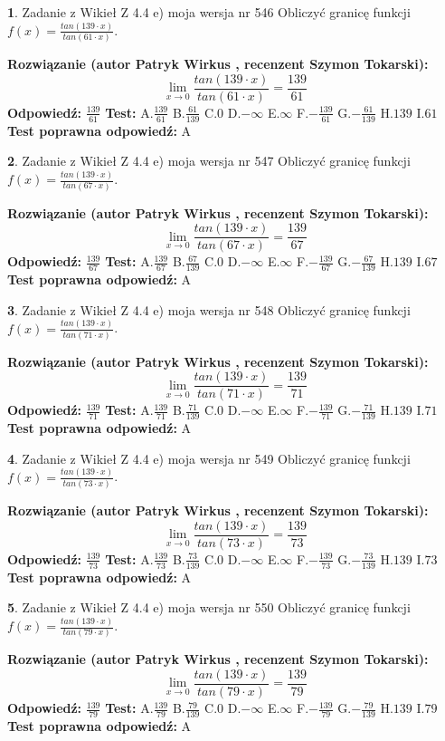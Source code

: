 \documentclass[12pt, a4paper]{article}
\theoremstyle{definition} %
\newtheorem{zad}{}
\newcommand{\zadStart}[1]{\begin{zad}#1\newline}
\newcommand{\zadStop}{\end{zad}}
\newcommand{\rozwStart}[2]{\noindent \textbf{Rozwiązanie (autor #1 , recenzent #2): }\newline}
\newcommand{\rozwStop}{\newline}
\newcommand{\odpStart}{\noindent \textbf{Odpowiedź:}\newline}
\newcommand{\odpStop}{\newline}
\newcommand{\testStart}{\noindent \textbf{Test:}\newline}
\newcommand{\testStop}{\newline}
\newcommand{\kluczStart}{\noindent \textbf{Test poprawna odpowiedź:}\newline}
\newcommand{\kluczStop}{\newline}
\begin{document}
\zadStart{Zadanie z Wikieł Z 4.4 e) moja wersja nr 546}
Obliczyć granicę funkcji $f(x)=\frac{tan(139\cdot x)}{tan(61\cdot x)}$.
\zadStop
\rozwStart{Patryk Wirkus}{Szymon Tokarski}
$$\lim\limits_{x\to 0}\frac{tan(139\cdot x)}{tan(61\cdot x)}=
\frac{139}{61}$$
\rozwStop
\odpStart
$\frac{139}{61}$
\odpStop
\testStart
A.$\frac{139}{61}$
B.$\frac{61}{139}$
C.$0$
D.$-\infty$
E.$\infty$
F.$-\frac{139}{61}$
G.$-\frac{61}{139}$
H.$139$
I.$61$
\testStop
\kluczStart
A
\kluczStop



\zadStart{Zadanie z Wikieł Z 4.4 e) moja wersja nr 547}
Obliczyć granicę funkcji $f(x)=\frac{tan(139\cdot x)}{tan(67\cdot x)}$.
\zadStop
\rozwStart{Patryk Wirkus}{Szymon Tokarski}
$$\lim\limits_{x\to 0}\frac{tan(139\cdot x)}{tan(67\cdot x)}=
\frac{139}{67}$$
\rozwStop
\odpStart
$\frac{139}{67}$
\odpStop
\testStart
A.$\frac{139}{67}$
B.$\frac{67}{139}$
C.$0$
D.$-\infty$
E.$\infty$
F.$-\frac{139}{67}$
G.$-\frac{67}{139}$
H.$139$
I.$67$
\testStop
\kluczStart
A
\kluczStop



\zadStart{Zadanie z Wikieł Z 4.4 e) moja wersja nr 548}
Obliczyć granicę funkcji $f(x)=\frac{tan(139\cdot x)}{tan(71\cdot x)}$.
\zadStop
\rozwStart{Patryk Wirkus}{Szymon Tokarski}
$$\lim\limits_{x\to 0}\frac{tan(139\cdot x)}{tan(71\cdot x)}=
\frac{139}{71}$$
\rozwStop
\odpStart
$\frac{139}{71}$
\odpStop
\testStart
A.$\frac{139}{71}$
B.$\frac{71}{139}$
C.$0$
D.$-\infty$
E.$\infty$
F.$-\frac{139}{71}$
G.$-\frac{71}{139}$
H.$139$
I.$71$
\testStop
\kluczStart
A
\kluczStop



\zadStart{Zadanie z Wikieł Z 4.4 e) moja wersja nr 549}
Obliczyć granicę funkcji $f(x)=\frac{tan(139\cdot x)}{tan(73\cdot x)}$.
\zadStop
\rozwStart{Patryk Wirkus}{Szymon Tokarski}
$$\lim\limits_{x\to 0}\frac{tan(139\cdot x)}{tan(73\cdot x)}=
\frac{139}{73}$$
\rozwStop
\odpStart
$\frac{139}{73}$
\odpStop
\testStart
A.$\frac{139}{73}$
B.$\frac{73}{139}$
C.$0$
D.$-\infty$
E.$\infty$
F.$-\frac{139}{73}$
G.$-\frac{73}{139}$
H.$139$
I.$73$
\testStop
\kluczStart
A
\kluczStop



\zadStart{Zadanie z Wikieł Z 4.4 e) moja wersja nr 550}
Obliczyć granicę funkcji $f(x)=\frac{tan(139\cdot x)}{tan(79\cdot x)}$.
\zadStop
\rozwStart{Patryk Wirkus}{Szymon Tokarski}
$$\lim\limits_{x\to 0}\frac{tan(139\cdot x)}{tan(79\cdot x)}=
\frac{139}{79}$$
\rozwStop
\odpStart
$\frac{139}{79}$
\odpStop
\testStart
A.$\frac{139}{79}$
B.$\frac{79}{139}$
C.$0$
D.$-\infty$
E.$\infty$
F.$-\frac{139}{79}$
G.$-\frac{79}{139}$
H.$139$
I.$79$
\testStop
\kluczStart
A
\kluczStop
\end{document}
